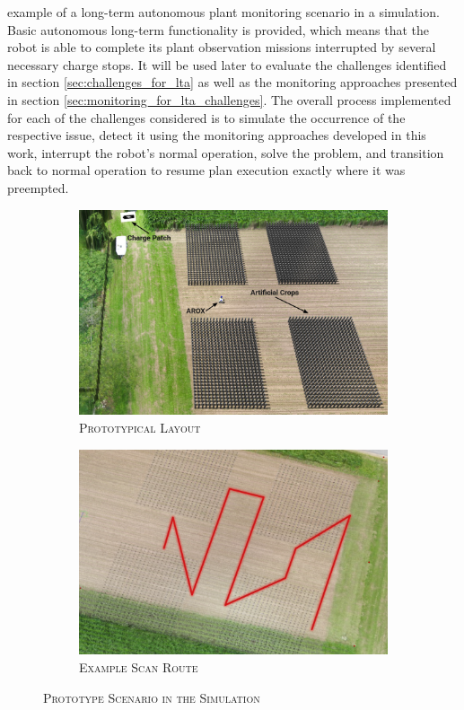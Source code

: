 \documentclass[english, master, utf8]{base/thesis_KBS}
\begin{document}
example of a long-term autonomous plant monitoring scenario in a simulation. Basic autonomous long-term functionality is provided, which means that the robot is able to 
complete its plant observation missions interrupted by several necessary charge stops. It will be used later to evaluate the challenges identified in section 
\ref{sec:challenges_for_lta} as well as the monitoring approaches presented in section \ref{sec:monitoring_for_lta_challenges}.
The overall process implemented for each of the challenges considered is to simulate the occurrence of the respective issue, detect it using
the monitoring approaches developed in this work, interrupt the robot's normal operation, solve the problem, and transition back to normal operation to resume 
plan execution exactly where it was preempted.
\begin{figure}[H]
    \centering
    \begin{subfigure}[b]{0.49\textwidth}
        \centering
        \includegraphics[width=\textwidth]{pics/prototype_scenario.jpg}
        \caption{\textsc{Prototypical Layout}}
        \label{fig:prototypical_layout}
    \end{subfigure}
    \hfill
    \begin{subfigure}[b]{0.49\textwidth}
        \centering
        \includegraphics[width=\textwidth]{pics/example_path.png}
        \caption{\textsc{Example Scan Route}}
        \label{fig:example_scan_route}
    \end{subfigure}
\caption{\textsc{Prototype Scenario in the Simulation}}
\label{fig:prototype_sim}
\end{figure}
\end{document}
